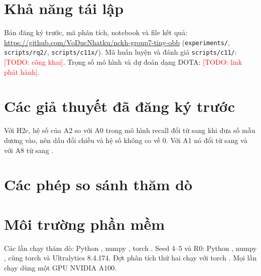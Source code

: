 \documentclass[11pt]{article}
\newcommand{\todo}[1]{\textcolor{red}{[TODO: #1]}}
\begin{document}
\section*{Khả năng tái lập}
Bản đăng ký trước, mã phân tích, notebook và file kết quả: \url{https://github.com/VoDucNhatku/nckh-group7-tiny-obb}
(\texttt{experiments/}, \texttt{scripts/rq2/}, \texttt{scripts/c11x/}). Mã huấn luyện và đánh giá \texttt{scripts/c11/}:
\todo{công khai}. Trọng số mô hình và dự đoán dạng DOTA: \todo{link phát hành}.

\appendix
\section{Các giả thuyết đã đăng ký trước}\label{app:prereg}
\begin{table}[h]\centering\caption{Mọi giả thuyết đã đăng ký trước và kết quả. Các mục H chạy trên mười hai lần chạy thăm dò trước
khi bản đăng ký trước được merge và là thăm dò; H2b và H2c dùng ảnh kiểm định và đầu NMS; P1 và các mục M theo phụ lục chốt trước
seed 4--5 (M1 và M3 dùng seed 1--5 trên test).}\label{tab:prereg}\scriptsize
\end{table}

Với H2c, hệ số của A2 so với A0 trong mô hình recall đổi từ \medAtwoWo{} sang \medAtwoW{} khi đưa số mẫu dương vào, nên dấu đổi chiều
và hệ số không co về 0. Với A1 nó đổi từ \medAoneWo{} sang \medAoneW{} và với A8 từ \medAeightWo{} sang \medAeightW.

\section{Các phép so sánh thăm dò}\label{app:explor}
\begin{table}[h]\centering\caption{Seed 1--3, test woX. Scene: chỉ bootstrap theo cụm cảnh. Scene + seed: khoảng kết hợp với $t$ hai
bậc tự do.}\label{tab:explor}\scriptsize\end{table}

\section{Môi trường phần mềm}\label{app:env}
Các lần chạy thăm dò: Python \envOldPython, numpy \envOldNumpy, torch \envOldTorch. Seed 4--5 và R0: Python \envNewPython, numpy
\envNewNumpy, cùng torch và Ultralytics 8.4.174. Đợt phân tích thứ hai chạy với torch \envPhTwoTorch. Mọi lần chạy dùng một GPU
NVIDIA A100.
\end{document}
